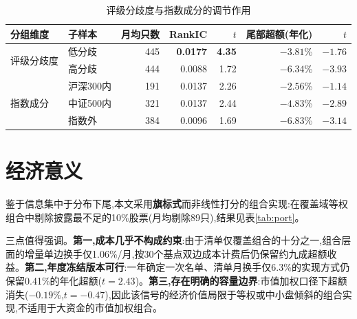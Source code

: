 \documentclass[UTF8, a4paper, fontset=fandol, zihao=-4]{ctexart}
\begin{document}
\begin{table}[H]
\centering
\begin{threeparttable}
\caption{评级分歧度与指数成分的调节作用}\label{tab:disag}
\begin{tabular}{llrrrrr}
\toprule
分组维度 & 子样本 & 月均只数 & RankIC & $t$ & 尾部超额(年化) & $t$ \\
\midrule
\multirow{2}{*}{评级分歧度} & 低分歧 & 445 & \textbf{0.0177} & \textbf{4.35} & $-3.81$\% & $-1.76$ \\
 & 高分歧 & 444 & 0.0088 & 1.72 & $\mathbf{-6.34}$\% & $\mathbf{-3.93}$ \\
\midrule
\multirow{3}{*}{指数成分} & 沪深300内 & 191 & 0.0137 & 2.26 & $-2.56$\% & $-1.14$ \\
 & 中证500内 & 321 & 0.0137 & 2.44 & $-4.83$\% & $-2.89$ \\
 & 指数外 & 384 & 0.0096 & 1.69 & $\mathbf{-6.83}$\% & $\mathbf{-3.14}$ \\
\bottomrule
\end{tabular}
\end{threeparttable}
\end{table}

\section{经济意义}

鉴于信息集中于分布下尾,本文采用\textbf{旗标式}而非线性打分的组合实现:在覆盖域等权组合中剔除披露最不足的10\%股票(月均剔除89只),结果见表\ref{tab:port}。

三点值得强调。\textbf{第一,成本几乎不构成约束}:由于清单仅覆盖组合的十分之一,组合层面的增量单边换手仅1.06\%/月,按30个基点双边成本计费后仍保留约九成超额收益。\textbf{第二,年度冻结版本可行}:一年确定一次名单、清单月换手仅6.3\%的实现方式仍保留0.41\%的年化超额($t=2.43$)。\textbf{第三,存在明确的容量边界}:市值加权口径下超额消失($-0.19$\%,$t=-0.47$),因此该信号的经济价值局限于等权或中小盘倾斜的组合实现,不适用于大资金的市值加权组合。
\end{document}
